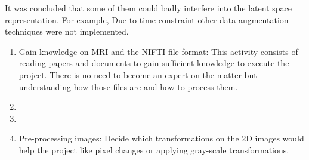 It was concluded that some of them could badly interfere into the latent space representation. For example,  
Due to time constraint other data augmentation techniques were not implemented.

\begin{enumerate}
    \item Gain knowledge on MRI and the NIFTI file format: This activity consists of reading papers and documents to gain sufficient knowledge to execute the project. There is no need to become an expert on the matter but understanding how those files are and how to process them.
    \item 
    \item 
    \item Pre-processing images: Decide which transformations on the 2D images would help the project like pixel changes or applying gray-scale transformations.
\end{enumerate}

